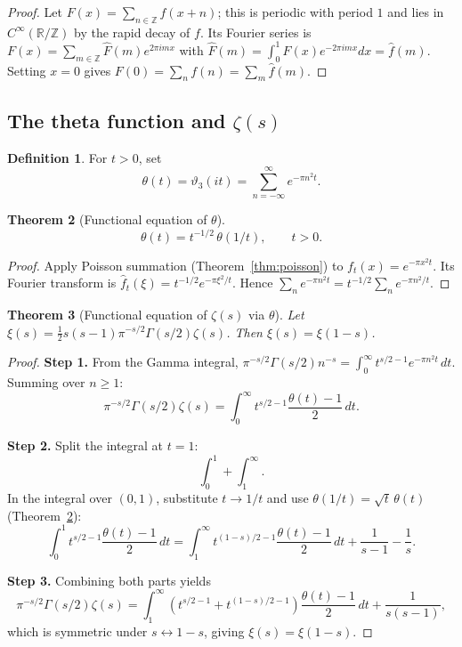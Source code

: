 \documentclass[12pt,a4paper]{amsart}
\newtheorem{theorem}{Theorem}[section]
\theoremstyle{definition}
\newtheorem{definition}[theorem]{Definition}
\begin{document}
\begin{proof}
Let $F(x) = \sum_{n\in\mathbb{Z}} f(x+n)$; this is periodic with period $1$ and
lies in $C^\infty(\mathbb{R}/\mathbb{Z})$ by the rapid decay of $f$.
Its Fourier series is $F(x) = \sum_{m\in\mathbb{Z}} \hat{F}(m) e^{2\pi imx}$ with
$\hat{F}(m) = \int_0^1 F(x) e^{-2\pi imx}dx = \hat{f}(m)$.
Setting $x = 0$ gives $F(0) = \sum_n f(n) = \sum_m \hat{f}(m)$.
\end{proof}

\subsection{The theta function and $\zeta(s)$}

\begin{definition}
For $t > 0$, set
\[
  \theta(t) = \vartheta_3(it) = \sum_{n=-\infty}^{\infty} e^{-\pi n^2 t}.
\]
\end{definition}

\begin{theorem}[Functional equation of $\theta$]\label{thm:theta_fe}
\[
  \theta(t) = t^{-1/2}\,\theta(1/t), \qquad t > 0.
\]
\end{theorem}

\begin{proof}
Apply Poisson summation (Theorem~\ref{thm:poisson}) to $f_t(x) = e^{-\pi x^2 t}$.
Its Fourier transform is $\hat{f}_t(\xi) = t^{-1/2} e^{-\pi\xi^2/t}$.
Hence $\sum_n e^{-\pi n^2 t} = t^{-1/2} \sum_n e^{-\pi n^2/t}$.
\end{proof}

\begin{theorem}[Functional equation of $\zeta(s)$ via $\theta$]\label{thm:zeta_fe}
Let $\xi(s) = \tfrac{1}{2}s(s-1)\pi^{-s/2}\Gamma(s/2)\zeta(s)$.  Then
$\xi(s) = \xi(1-s)$.
\end{theorem}

\begin{proof}
\textbf{Step 1.}  From the Gamma integral,
$\pi^{-s/2}\Gamma(s/2) n^{-s} = \int_0^\infty t^{s/2-1} e^{-\pi n^2 t}\,dt$.
Summing over $n \geq 1$:
\[
  \pi^{-s/2}\Gamma(s/2)\zeta(s)
  = \int_0^\infty t^{s/2-1} \frac{\theta(t)-1}{2}\,dt.
\]

\textbf{Step 2.} Split the integral at $t=1$:
\[
  \int_0^1 + \int_1^\infty.
\]
In the integral over $(0,1)$, substitute $t \to 1/t$ and use
$\theta(1/t) = \sqrt{t}\,\theta(t)$ (Theorem~\ref{thm:theta_fe}):
\[
  \int_0^1 t^{s/2-1}\frac{\theta(t)-1}{2}\,dt
  = \int_1^\infty t^{(1-s)/2 - 1}\frac{\theta(t)-1}{2}\,dt
    + \frac{1}{s-1} - \frac{1}{s}.
\]

\textbf{Step 3.}  Combining both parts yields
\[
  \pi^{-s/2}\Gamma(s/2)\zeta(s)
  = \int_1^\infty \left(t^{s/2-1}+t^{(1-s)/2-1}\right)\frac{\theta(t)-1}{2}\,dt
    + \frac{1}{s(s-1)},
\]
which is symmetric under $s \leftrightarrow 1-s$, giving $\xi(s) = \xi(1-s)$.
\end{proof}
\end{document}
